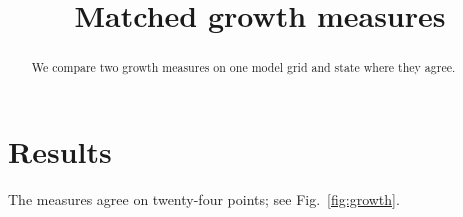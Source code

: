 \documentclass{article}
\begin{document}
\title{Matched growth measures}
\maketitle
\begin{abstract}
We compare two growth measures on one model grid and state where they agree.
\end{abstract}

\section{Results}\label{sec:results}
The measures agree on twenty-four points; see Fig.~\ref{fig:growth}.


\end{document}
